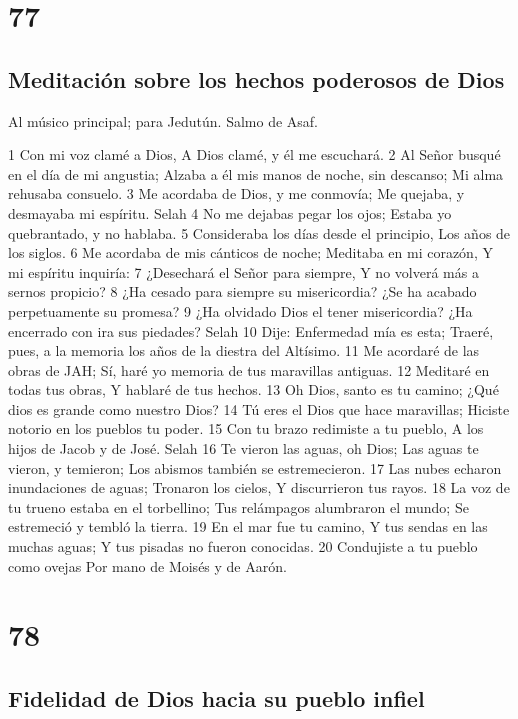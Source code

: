 \chapter{77}

\section*{Meditación sobre los hechos poderosos de Dios}

Al músico principal; para Jedutún. Salmo de Asaf.

1 Con mi voz clamé a Dios,
A Dios clamé, y él me escuchará.
2 Al Señor busqué en el día de mi angustia;
Alzaba a él mis manos de noche, sin descanso;
Mi alma rehusaba consuelo.
3 Me acordaba de Dios, y me conmovía;
Me quejaba, y desmayaba mi espíritu. Selah
4 No me dejabas pegar los ojos;
Estaba yo quebrantado, y no hablaba.
5 Consideraba los días desde el principio,
Los años de los siglos.
6 Me acordaba de mis cánticos de noche;
Meditaba en mi corazón,
Y mi espíritu inquiría:
7 ¿Desechará el Señor para siempre,
Y no volverá más a sernos propicio?
8 ¿Ha cesado para siempre su misericordia?
¿Se ha acabado perpetuamente su promesa?
9 ¿Ha olvidado Dios el tener misericordia?
¿Ha encerrado con ira sus piedades? Selah
10 Dije: Enfermedad mía es esta;
Traeré, pues, a la memoria los años de la diestra del Altísimo.
11 Me acordaré de las obras de JAH;
Sí, haré yo memoria de tus maravillas antiguas.
12 Meditaré en todas tus obras,
Y hablaré de tus hechos.
13 Oh Dios, santo es tu camino;
¿Qué dios es grande como nuestro Dios?
14 Tú eres el Dios que hace maravillas;
Hiciste notorio en los pueblos tu poder.
15 Con tu brazo redimiste a tu pueblo,
A los hijos de Jacob y de José. Selah
16 Te vieron las aguas, oh Dios;
Las aguas te vieron, y temieron;
Los abismos también se estremecieron.
17 Las nubes echaron inundaciones de aguas;
Tronaron los cielos,
Y discurrieron tus rayos.
18 La voz de tu trueno estaba en el torbellino;
Tus relámpagos alumbraron el mundo;
Se estremeció y tembló la tierra.
19 En el mar fue tu camino,
Y tus sendas en las muchas aguas;
Y tus pisadas no fueron conocidas.
20 Condujiste a tu pueblo como ovejas
Por mano de Moisés y de Aarón.

\chapter{78}

\section*{Fidelidad de Dios hacia su pueblo infiel}

